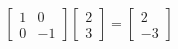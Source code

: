 \documentclass[preview]{standalone}
\begin{document}
\begin{align*}
\begin{bmatrix} 1 & 0 \\ 0 & -1 \end{bmatrix} \begin{bmatrix} 2 \\ 3 \end{bmatrix}= \begin{bmatrix} 2 \\ -3 \end{bmatrix}
\end{align*}
\end{document}
